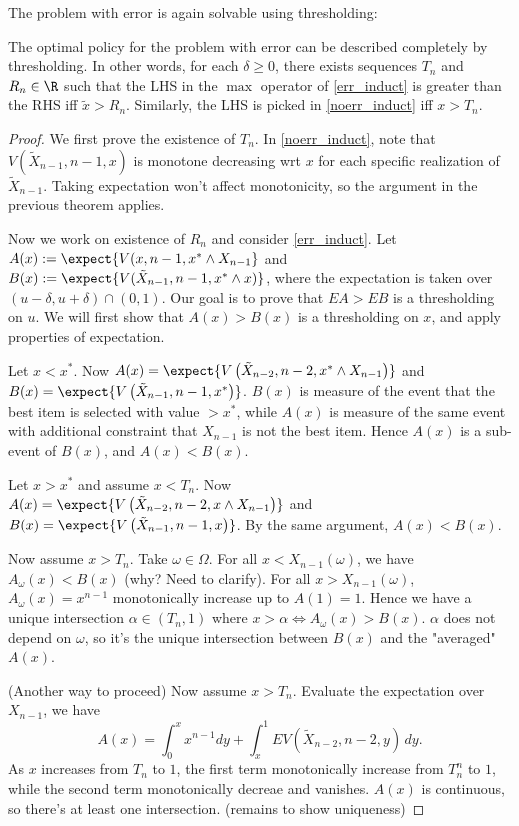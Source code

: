 The problem with error is again solvable using thresholding:
\begin{theorem}
	The optimal policy for the problem with error can be described completely by thresholding. In other words, for each $\delta \ge 0$, there exists sequences $T_n$ and $R_n \in \R$ such that the LHS in the $\max$ operator of \eqref{err_induct} is greater than the RHS iff $\tilde x > R_n$. Similarly, the LHS is picked in \eqref{noerr_induct} iff $x > T_n$.
\end{theorem}
\begin{proof}
	We first prove the existence of $T_{n}$. In \eqref{noerr_induct}, note that $ V(\tilde X_{n-1}, n-1, x)$ is monotone decreasing wrt $x$ for each specific realization of $\tilde X_{n-1}$. Taking expectation won't affect monotonicity, so the argument in the previous theorem applies.  
	
	Now we work on existence of $R_{n}$ and consider \eqref{err_induct}. Let $A(x) := \expect{V(x, n-1, x^* \wedge X_{n-1}}$ and $B(x):= \expect{V(\tilde X_{n-1}, n-1, x^* \wedge x)}$, where the expectation is taken over $(u-\delta, u+\delta)\cap (0,1)$. Our goal is to prove that $EA > EB$ is a thresholding on $u$. We will first show that $A(x)>B(x)$ is a thresholding on $x$, and apply properties of expectation.
	
	Let $x < x^*$. Now $A(x) = \expect{V\left( \tilde X_{n-2}, n-2, x^* \wedge X_{n-1} \right) }$ and $B(x) = \expect{V\left( \tilde X_{n-1}, n-1, x^* \right) }$. $B(x)$ is measure of the event that the best item is selected with value $>x^*$, while $A(x)$ is measure of the same event with additional constraint that $X_{n-1}$ is not the best item. Hence $A(x)$ is a sub-event of $B(x)$, and $A(x) < B(x)$.

	Let $x > x^*$ and assume $x < T_{n}$. Now $A(x) = \expect{V\left( \tilde X_{n-2}, n-2, x \wedge X_{n-1} \right) }$ and $B(x) = \expect{V\left( \tilde X_{n-1}, n-1, x \right) }$. By the same argument, $A(x) < B(x)$.
	
	Now assume $x > T_{n}$. Take $\omega \in \Omega$. For all $x < X_{n-1}(\omega)$, we have $A_\omega(x) < B(x)$ (why? Need to clarify). For all $x > X_{n-1}(\omega)$, $A_\omega(x) = x^{n-1}$  monotonically increase up to $A(1) = 1$. Hence we have a unique intersection  $\alpha \in (T_{n}, 1)$ where $x > \alpha \iff A_\omega(x) > B(x)$. $\alpha$ does not depend on $\omega$, so it's the unique intersection between $B(x)$ and the "averaged"  $A(x)$.

	(Another way to proceed) Now assume $x > T_{n}$. Evaluate the expectation over $X_{n-1}$, we have \[
	A(x) = \int_0^x x^{n-1} dy + \int_x^1 EV(\tilde X_{n-2}, n-2, y) \, dy
	.\] 
	As $x$ increases from $T_{n}$ to $1$, the first term monotonically increase from $T_{n}^n$ to $1$, while the second term monotonically decreae and vanishes. $A(x)$ is continuous, so there's at least one intersection. (remains to show uniqueness)
\end{proof}

